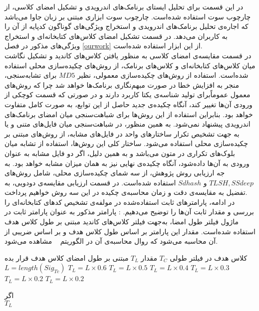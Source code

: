 در این قسمت برای تحلیل ایستا‌ی برنامک‌های اندرویدی و تشکیل امضای کلاسی، از چارچوب سوت استفاده شده‌است. چارچوب سوت ابزاری‌ مبتنی بر زبان جاوا می‌باشد که اجاره‌ی تحلیل برنامک‌های اندرویدی و استخراج ویژگی‌های گوناگون کد‌پایه از آن را به کاربران می‌دهد. در قسمت تشکیل امضای کلاس‌های کتابخانه‌ای و استخراج ویژگی‌های مذکور در فصل
\ref{ourwork}
از این ابزار استفاده شده‌‌است.\\
در قسمت مقایسه‌‌ی امضا‌ی کلاسی به منظور یافتن کلاس‌های کاندید و تشکیل نگاشت میان کلاس‌های کتابخانه‌ای و کلاس‌ها‌ی برنامک، از روش‌‌های چکیده‌سازی محلی استفاده شده‌است. استفاده از روش‌های چکیده‌سازی معمولی، نظیر $MD5$ برای تشابه‌سنجی، منجر به افزایش خطا در صورت مبهم‌نگاری برنامک‌ها خواهد شد چرا که روش‌های معمول عموماً‌برای تولید شناسه‌ی یکتا کاربرد دارند و در صورتی که قسمت کوچکی از ورودی آن‌ها تغییر کند، آنگاه چکیده‌ی جدید حاصل از این توابع، به صورت کامل متفاوت خواهد بود. بنابراین استفاده از این روش‌ها برای شباهت‌سنجی میان امضای برنامک‌های اندرویدی پیشنهاد نمی‌شود. به همین منظور، در شباهت‌سنجی میان فایل‌های متنی و یا به جهت تشخیص تکرار ساختار‌های واحد در فایل‌های مشابه، از روش‌های مبتنی بر چکیده‌سازی محلی استفاده می‌شود. ساختار کلی این روش‌ها، استفاده از تشابه میان بلوک‌های تکراری در متون می‌باشد و به همین دلیل، اگر دو فایل مشابه به عنوان ورودی به آن‌ها داده‌شود، آنگاه چکیده‌ی نهایی نیز به همان میزان مشابه خواهد بود. به جه ارزیابی روش پژوهش، از سه شمای چکیده‌سازی محلی، شامل روش‌های $TLSH,SSdeep$ و $Sdhash$ استفاده شده‌است. در قسمت ارزیابی مقایسه‌ی دودویی، به تفضیل به مقایسه‌ی دقت و زمان محاسبه‌ی چکیده در این سه روش خواهیم پرداخت.\\
در ادامه، پارامتر‌های ثابت استفاده‌شده در مولفه‌ی تشخیص کد‌های کتابخانه‌ای را بررسی و مقدار ثابت‌ آن‌ها را توضیح می‌دهیم.
: پارامتر مذکور به عنوان پارامتر ثابت در ماژول فیلتر طول امضا، به‌جهت فیلتر کلاس‌‌های کاندید مبتنی بر طول کلاس هدف استفاده شده‌است. مقدار این پارامتر بر اساس طول کلاس هدف و بر اساس ضریبی از آن محاسبه می‌شود که روال محاسبه‌ی آن در الگوریتم ~ مشاهده می‌شود.

 کلاس هدف در فیلتر طولی $T_C$
 مقدار $T_L$ مبتنی بر طول امضای کلاس هدف
 قرار بده 
$L=length(Sig_{Tc})$
$T_{L} = L \times 0.6$
$T_{L} = L \times 0.5$
$T_{L} = L \times 0.4$
$T_{L} = L \times 0.3$
$T_{L} = L \times 0.2$
$T_{L} = L \times 0.2$

‌اگر\\
 $T_{L}$
